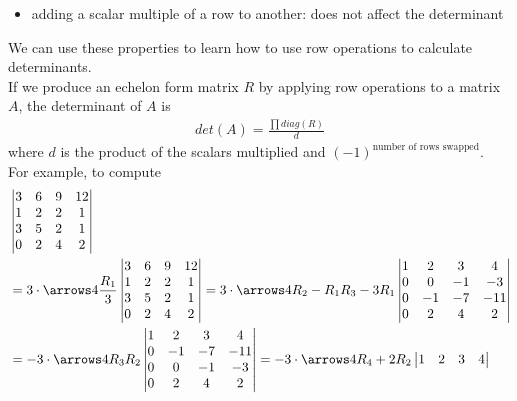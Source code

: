\begin{itemize}
\begin{itemize}
      \item adding a scalar multiple of a row to another: does not affect the determinant
    \end{itemize}
    We can use these properties to learn how to use row operations to calculate determinants.\\
    If we produce an echelon form matrix $R$ by applying row operations to a matrix $A$, the determinant of $A$ is
    \begin{align*}
      det(A) = \frac{\prod diag(R)}{d}
    \end{align*}
    where $d$ is the product of the scalars multiplied and $(-1)^{\text{number of rows swapped}}$.\\
    For example, to compute
    \begin{align*}
      &\begin{vmatrix}
        3 & 6 & 9 & 12\\
        1 & 2 & 2 & 1\\
        3 & 5 & 2 & 1\\
        0 & 2 & 4 & 2
      \end{vmatrix}
      \\
      &= 3 \cdot
      \arrows4{\frac{R_1}{3}}{}{}{}
      \begin{vmatrix}
        3 & 6 & 9 & 12\\
        1 & 2 & 2 & 1\\
        3 & 5 & 2 & 1\\
        0 & 2 & 4 & 2
      \end{vmatrix}
      =
      3 \cdot
      \arrows4{}{R_2 - R_1}{R_3 - 3R_1}{}
      \begin{vmatrix}
        1 & 2 & 3 & 4\\
        0 & 0 & -1 & -3\\
        0 & -1 & -7 & -11\\
        0 & 2 & 4 & 2
      \end{vmatrix}
      \\
      &=
      -3 \cdot
      \arrows4{}{R_3}{R_2}{}
      \begin{vmatrix}
        1 & 2 & 3 & 4\\
        0 & -1 & -7 & -11\\
        0 & 0 & -1 & -3\\
        0 & 2 & 4 & 2
      \end{vmatrix}
      =
      -3 \cdot
      \arrows4{}{}{}{R_4 + 2R_2}
      \begin{vmatrix}
        1 & 2 & 3 & 4\\

\end{vmatrix}
\end{align*}
\end{itemize}
